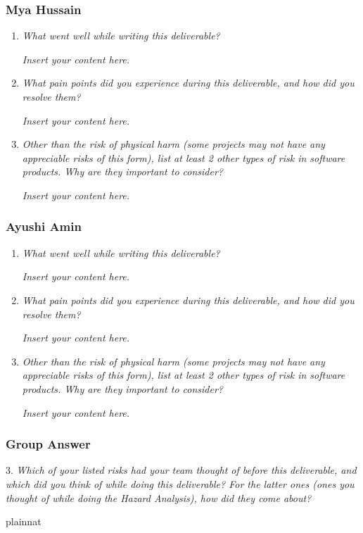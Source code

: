 \documentclass{article}
\newcommand{\lips}{\textit{Insert your content here.}}
\begin{document}
\subsubsection*{Mya Hussain}

\begin{enumerate}
  \item \textit{What went well while writing this deliverable?}
  
  \lips

  \item \textit{What pain points did you experience during this deliverable, and how did you resolve them?}
  
  \lips
  
  \item[4.] \textit{Other than the risk of physical harm (some projects may not have any appreciable risks of this form),
  list at least 2 other types of risk in software products. Why are they important to consider?}

  \lips

\end{enumerate}

\subsubsection*{Ayushi Amin}

\begin{enumerate}
  \item \textit{What went well while writing this deliverable?}
  
  \lips

  \item \textit{What pain points did you experience during this deliverable, and how did you resolve them?}
  
  \lips
  
  \item[4.] \textit{Other than the risk of physical harm (some projects may not have any appreciable risks of this form),
  list at least 2 other types of risk in software products. Why are they important to consider?}

  \lips

\end{enumerate}

\subsubsection*{Group Answer}

3. \textit{Which of your listed risks had your team thought of before this deliverable, and which did you think of while doing this deliverable? For the latter ones (ones you thought of while doing the Hazard Analysis), how did they come about?}

 {plainnat}

\end{document}
